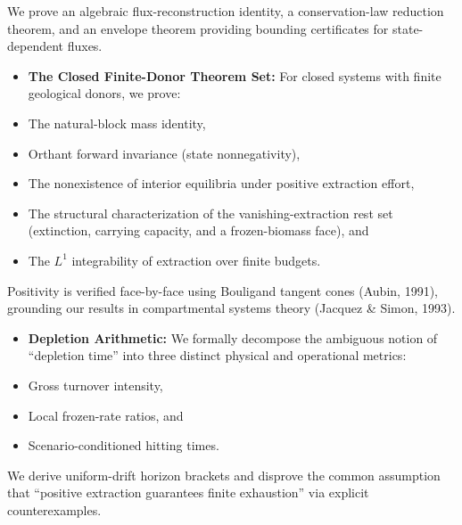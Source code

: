 \documentclass[11pt]{article}
\begin{document}
We prove an algebraic flux-reconstruction identity, a conservation-law reduction theorem, and an envelope theorem providing bounding certificates for state-dependent fluxes.

\begin{itemize}\setlength{\itemsep}{2pt}
\item \textbf{The Closed Finite-Donor Theorem Set:} For closed systems with finite geological donors, we prove:
\item The natural-block mass identity,
\item Orthant forward invariance (state nonnegativity),
\item The nonexistence of interior equilibria under positive extraction effort,
\item The structural characterization of the vanishing-extraction rest set (extinction, carrying capacity, and a frozen-biomass face), and
\item The \(L^1\) integrability of extraction over finite budgets.
\end{itemize}

Positivity is verified face-by-face using Bouligand tangent cones (Aubin, 1991), grounding our results in compartmental systems theory (Jacquez \& Simon, 1993).

\begin{itemize}\setlength{\itemsep}{2pt}
\item \textbf{Depletion Arithmetic:} We formally decompose the ambiguous notion of ``depletion time'' into three distinct physical and operational metrics:
\item Gross turnover intensity,
\item Local frozen-rate ratios, and
\item Scenario-conditioned hitting times.
\end{itemize}

We derive uniform-drift horizon brackets and disprove the common assumption that ``positive extraction guarantees finite exhaustion'' via explicit counterexamples.
\end{document}
